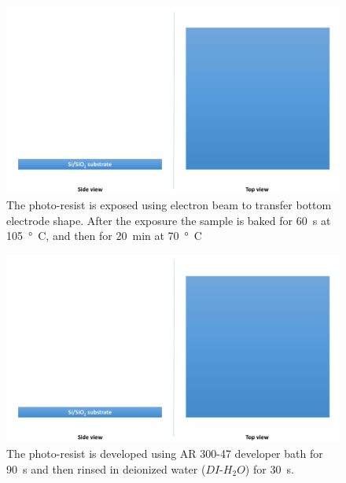 \newpage
\begin{multicols}{2}[]
    
    \begin{figure}[H]
        \centering
        \includegraphics[width=0.375\paperwidth, page=5]{img/04/Manufacturing_under.pdf}
        \caption{The photo-resist is exposed using electron beam to transfer bottom electrode shape. After the exposure the sample is baked for \SI{60}{\second} at \SI{105}{\degree C}, and then for \SI{20}{\minute} at \SI{70}{\degree C}}
        \label{FabricationBottomExposure}
    \end{figure}
    
    \begin{figure}[H]
        \centering
        \includegraphics[width=0.375\paperwidth, page=6]{img/04/Manufacturing_under.pdf}
        \caption{The photo-resist is developed using AR 300-47 developer bath for \SI{90}{\second} and then rinsed in deionized water ($DI$-$H_2O$) for \SI{30}{\second}.}
        \label{FabricationBottomDeveloping}
    \end{figure}
    
\end{multicols}
